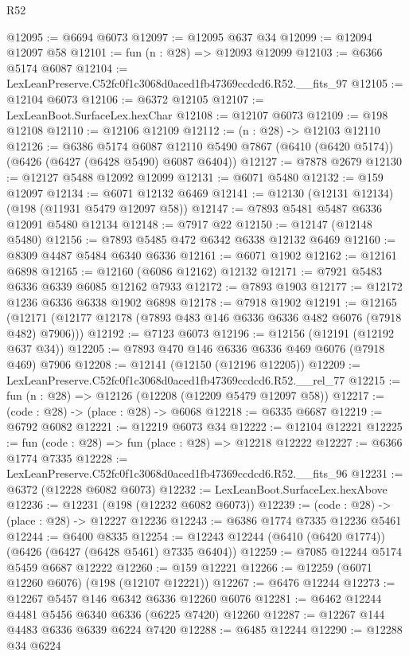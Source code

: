 \begin{lexlean}{R52}
\begin{coremodule}
@12095 := @6694 @6073
@12097 := @12095 @637 @34
@12099 := @12094 @12097 @58
@12101 := fun (n : @28) => @12093 @12099
@12103 := @6366 @5174 @6087
@12104 := LexLeanPreserve.C52fc0f1c3068d0aced1fb47369ccdcd6.R52.__fits_97
@12105 := @12104 @6073
@12106 := @6372 @12105
@12107 := LexLeanBoot.SurfaceLex.hexChar
@12108 := @12107 @6073
@12109 := @198 @12108
@12110 := @12106 @12109
@12112 := (n : @28) -> @12103 @12110
@12126 := @6386
    @5174
    @6087
    @12110
    @5490
    @7867
    (@6410 (@6420 @5174))
    (@6426 (@6427 (@6428 @5490) @6087 @6404))
@12127 := @7878 @2679
@12130 := @12127 @5488 @12092 @12099
@12131 := @6071 @5480
@12132 := @159 @12097
@12134 := @6071 @12132 @6469
@12141 := @12130 (@12131 @12134) (@198 (@11931 @5479 @12097 @58))
@12147 := @7893 @5481 @5487 @6336 @12091 @5480 @12134
@12148 := @7917 @22
@12150 := @12147 (@12148 @5480)
@12156 := @7893 @5485 @472 @6342 @6338 @12132 @6469
@12160 := @8309 @4487 @5484 @6340 @6336
@12161 := @6071 @1902
@12162 := @12161 @6898
@12165 := @12160 (@6086 @12162) @12132
@12171 := @7921 @5483 @6336 @6339 @6085 @12162 @7933
@12172 := @7893 @1903
@12177 := @12172 @1236 @6336 @6338 @1902 @6898
@12178 := @7918 @1902
@12191 := @12165
    (@12171 (@12177 @12178 (@7893 @483 @146 @6336 @6336 @482 @6076 (@7918 @482) @7906)))
@12192 := @7123 @6073
@12196 := @12156 (@12191 (@12192 @637 @34))
@12205 := @7893 @470 @146 @6336 @6336 @469 @6076 (@7918 @469) @7906
@12208 := @12141 (@12150 (@12196 @12205))
@12209 := LexLeanPreserve.C52fc0f1c3068d0aced1fb47369ccdcd6.R52.__rel_77
@12215 := fun (n : @28) => @12126 (@12208 (@12209 @5479 @12097 @58))
@12217 := (code : @28) -> (place : @28) -> @6068
@12218 := @6335 @6687
@12219 := @6792 @6082
@12221 := @12219 @6073 @34
@12222 := @12104 @12221
@12225 := fun (code : @28) => fun (place : @28) => @12218 @12222
@12227 := @6366 @1774 @7335
@12228 := LexLeanPreserve.C52fc0f1c3068d0aced1fb47369ccdcd6.R52.__fits_96
@12231 := @6372 (@12228 @6082 @6073)
@12232 := LexLeanBoot.SurfaceLex.hexAbove
@12236 := @12231 (@198 (@12232 @6082 @6073))
@12239 := (code : @28) -> (place : @28) -> @12227 @12236
@12243 := @6386 @1774 @7335 @12236 @5461
@12244 := @6400 @8335
@12254 := @12243 @12244 (@6410 (@6420 @1774)) (@6426 (@6427 (@6428 @5461) @7335 @6404))
@12259 := @7085 @12244 @5174 @5459 @6687 @12222
@12260 := @159 @12221
@12266 := @12259 (@6071 @12260 @6076) (@198 (@12107 @12221))
@12267 := @6476 @12244
@12273 := @12267 @5457 @146 @6342 @6336 @12260 @6076
@12281 := @6462 @12244 @4481 @5456 @6340 @6336 (@6225 @7420) @12260
@12287 := @12267 @144 @4483 @6336 @6339 @6224 @7420
@12288 := @6485 @12244
@12290 := @12288 @34 @6224

\end{coremodule}
\end{lexlean}

